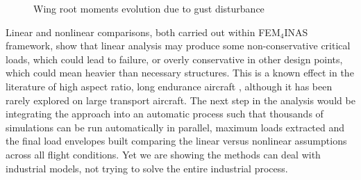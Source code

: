 \documentclass[11pt]{article}
\begin{document}
\begin{figure}[ht!]
\centering
{}
\caption{Wing root moments evolution due to gust disturbance}\label{fig8:MxMy}
\end{figure}
Linear and nonlinear comparisons, both carried out within FEM$_4$INAS framework, show that linear analysis may produce some  non-conservative critical loads, which could lead to failure, or overly conservative in other design points, which could mean heavier than necessary structures. This is a known effect in the literature of high aspect ratio, long endurance aircraft \cite{Palacios2014}, although it has been rarely explored on large transport aircraft. The next step in the analysis would be integrating the approach into an automatic process such that thousands of simulations can be run automatically  in parallel, maximum loads extracted and the final load envelopes built comparing the linear versus nonlinear assumptions across all flight conditions. Yet we are showing the methods can deal with industrial models, not trying to solve  the entire industrial process. 
\\



\end{document}
